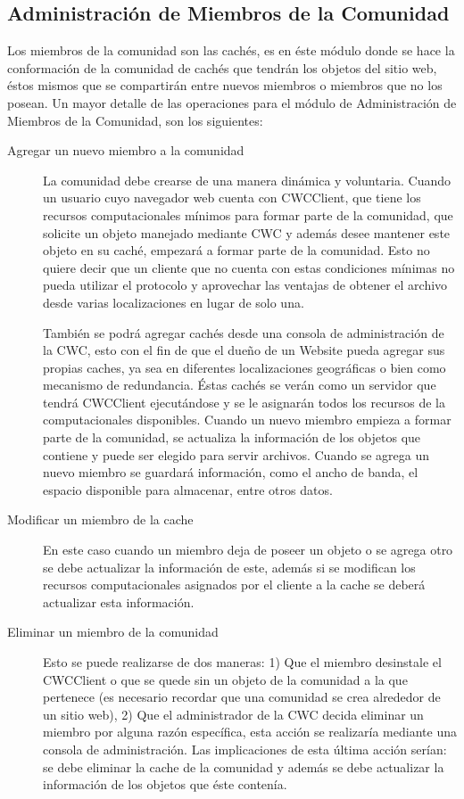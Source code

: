 \subsection{Administración de Miembros de la Comunidad }
Los miembros de la comunidad son las cachés, es en éste módulo donde se hace la conformación de la comunidad de cachés que tendrán los objetos del sitio web, éstos mismos que se compartirán entre nuevos miembros o miembros que no los posean. Un mayor detalle de las operaciones para el módulo de Administración de Miembros de la Comunidad, son los siguientes:

\begin{description}
\item[Agregar un nuevo miembro a la comunidad] La comunidad debe crearse de una manera dinámica y voluntaria. Cuando un usuario cuyo navegador web cuenta con CWCClient, que tiene los recursos computacionales mínimos para formar parte de la comunidad, que solicite un objeto manejado mediante CWC y además desee mantener este objeto en su caché, empezará a formar parte de la comunidad. Esto no quiere decir que un cliente que no cuenta con estas condiciones mínimas no pueda utilizar el protocolo y aprovechar las ventajas de obtener el archivo desde varias localizaciones en lugar de solo una. 

También se podrá agregar cachés desde una consola de administración de la CWC, esto con el fin de que el dueño de un Website pueda agregar sus propias caches, ya sea en diferentes localizaciones geográficas o bien como mecanismo de redundancia. Éstas cachés se verán como un servidor que tendrá CWCClient ejecutándose y se le asignarán todos los recursos de la computacionales disponibles. Cuando un nuevo miembro empieza a formar parte de la comunidad, se actualiza la información de los objetos que contiene y puede ser elegido para servir archivos. Cuando se agrega un nuevo miembro se guardará información, como el ancho de banda, el espacio disponible para almacenar, entre otros datos. 

\item[Modificar un miembro de la cache] En este caso cuando un miembro deja de poseer un objeto o se agrega otro se debe actualizar la información de este, además si se modifican los recursos computacionales asignados por el cliente a la cache se deberá actualizar esta información.

\item[Eliminar un miembro de la comunidad] Esto se puede realizarse de dos maneras: 1) Que el miembro desinstale el CWCClient o que se quede sin un objeto de la comunidad a la que pertenece (es necesario recordar  que una comunidad se crea alrededor de un sitio web), 2) Que el administrador de la CWC decida eliminar un miembro por alguna razón específica, esta acción se realizaría mediante una consola de administración. Las implicaciones de esta última acción serían: se debe eliminar la cache de la comunidad y además se debe actualizar la información de los objetos que éste contenía.


\end{description}
